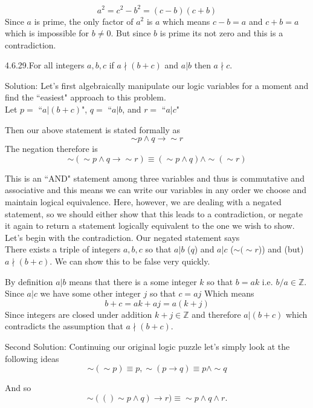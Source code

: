\documentclass[16 pt]{amsart}
\theoremstyle{definition}
\theoremstyle{remark}
\numberwithin{equation}{subsection}
\newcommand{\Z}{\mathbb{Z}}
\begin{document}
\[
a^2 = c^2-b^2 = (c-b)(c+b)
\]
Since $a$ is prime, the only factor of $a^2$ is $a$ which means $c-b=a$ and $c+b=a$ which is impossible for $b\neq 0$.  But since $b$ is prime its not zero and this is a contradiction.


\newpage

4.6.29.For all integers $a,b,c$ if $a\nmid (b+c)$ and $a|b$ then $a\nmid  c$.

\vspace{1in}

Solution: Let's first algebraically manipulate our logic variables for a moment and find the ``easiest" approach to this problem.\\

Let $p = $ ``$a | (b+c)$", $q = $ ``$a|b$, and $r =$ ``$a|c$"

Then our above statement is stated formally as
\[
\sim p \wedge q \rightarrow \sim r
\]
The negation therefore is
\[
\sim(\sim p \wedge q \rightarrow \sim r) \equiv (\sim p \wedge q) \wedge \sim(\sim r) 
\]

This is an ``AND" statement among three variables and thus is commutative and associative and this means we can write our variables in any order we choose and maintain logical equivalence.  Here, however, we are dealing with a negated statement, so we should either show that this leads to a contradiction, or negate it again to return a statement logically equivalent to the one we wish to show.\\

Let's begin with the contradiction.  Our negated statement says\\

There exists a triple of integers $a,b,c$ so that $a|b$ ($q$) and $a|c$ ($\sim(\sim r$)) and (but) $a\nmid (b+c)$.
We can show this to be false very quickly.

By definition $a|b$ means that there is a some integer $k$ so that $b = ak$ i.e. $b/a\in\Z$.  Since $a|c$ we have some other integer $j$ so that $c = aj$ Which means
\[
b+c = ak + aj = a(k+j)
\]
Since integers are closed under addition $k+j\in\Z$ and therefore $a|(b+c)$ which contradicts the assumption that $a\nmid (b+c)$.

\vspace{1in}

Second Solution:  Continuing our original logic puzzle let's simply look at the following ideas
\[
\sim(\sim p) \equiv p, \sim(p\rightarrow q) \equiv p\wedge \sim q
\]

And so 
\[
\sim(()\sim p \wedge q) \rightarrow r) \equiv \sim p \wedge q \wedge r.
\]
\end{document}
